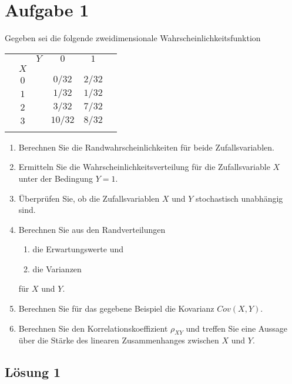 \documentclass[main.tex]{subfiles}
\begin{document}
\section{Aufgabe 1}
Gegeben sei die folgende zweidimensionale Wahrscheinlichkeitsfunktion
\begin{center}
\begin{tabular}{|lcr|c|c|c|}\hline
\quad &	& $Y$ & $0$ & $1$ & \qquad \qquad \\
& $X$ & & & & \\\hline
& $0$ &	& $0/32$ & $2/32$ &  \\\hline
& $1$ &	& $1/32$ & $1/32$ & \\\hline
& $2$ &	& $3/32$ & $7/32$ & \\\hline
& $3$ &	& $10/32$ &	$8/32$ & \\\hline
& & & & & \\ \hline
\end{tabular}
\end{center}
\begin{enumerate}
\item	Berechnen Sie die Randwahrscheinlichkeiten für beide Zufallsvariablen.
\item	Ermitteln Sie die Wahrscheinlichkeitsverteilung für die Zufallsvariable $X$ unter der Bedingung $Y=1$.
\item	Überprüfen Sie, ob die Zufallsvariablen $X$ und $Y$ stochastisch unabhängig sind.
\item	Berechnen Sie aus den Randverteilungen
\begin{enumerate}
\item die Erwartungswerte und
\item die Varianzen
\end{enumerate}
für $X$ und $Y$.
\item	Berechnen Sie für das gegebene Beispiel die Kovarianz $Cov(X,Y)$.
\item	Berechnen Sie den Korrelationskoeffizient $\rho_{XY}$ und treffen Sie eine Aussage über die Stärke des linearen
Zusammenhanges zwischen $X$ und	$Y$.
\end{enumerate}

\subsection{Lösung 1}
\end{document}
